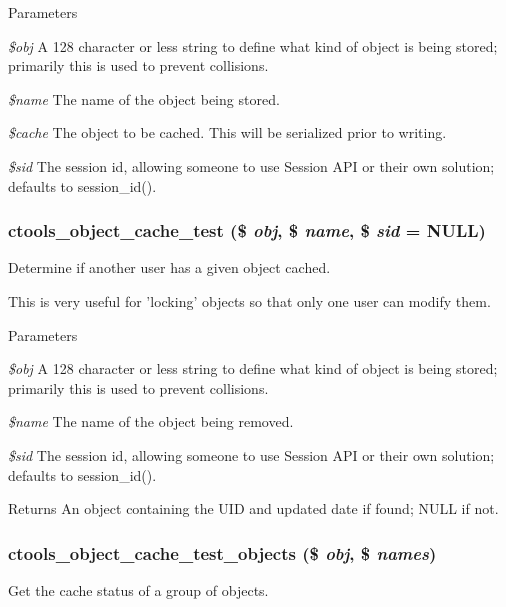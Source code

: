 \begin{DoxyParams}{Parameters}
\item[{\em \$obj}]A 128 character or less string to define what kind of object is being stored; primarily this is used to prevent collisions. \item[{\em \$name}]The name of the object being stored. \item[{\em \$cache}]The object to be cached. This will be serialized prior to writing. \item[{\em \$sid}]The session id, allowing someone to use Session API or their own solution; defaults to session\_\-id(). \end{DoxyParams}
\hypertarget{object-cache_8inc_ade46d09e7031cf1ae127155cdea77668}{
\subsubsection[{ctools\_\-object\_\-cache\_\-test}]{\setlength{\rightskip}{0pt plus 5cm}ctools\_\-object\_\-cache\_\-test (\$ {\em obj}, \/  \$ {\em name}, \/  \$ {\em sid} = {\ttfamily NULL})}}
\label{object-cache_8inc_ade46d09e7031cf1ae127155cdea77668}
Determine if another user has a given object cached.

This is very useful for 'locking' objects so that only one user can modify them.


\begin{DoxyParams}{Parameters}
\item[{\em \$obj}]A 128 character or less string to define what kind of object is being stored; primarily this is used to prevent collisions. \item[{\em \$name}]The name of the object being removed. \item[{\em \$sid}]The session id, allowing someone to use Session API or their own solution; defaults to session\_\-id().\end{DoxyParams}
\begin{DoxyReturn}{Returns}
An object containing the UID and updated date if found; NULL if not. 
\end{DoxyReturn}
\hypertarget{object-cache_8inc_a02b391662c8dc1a8f1de75542fbad218}{
\subsubsection[{ctools\_\-object\_\-cache\_\-test\_\-objects}]{\setlength{\rightskip}{0pt plus 5cm}ctools\_\-object\_\-cache\_\-test\_\-objects (\$ {\em obj}, \/  \$ {\em names})}}
\label{object-cache_8inc_a02b391662c8dc1a8f1de75542fbad218}
Get the cache status of a group of objects.

